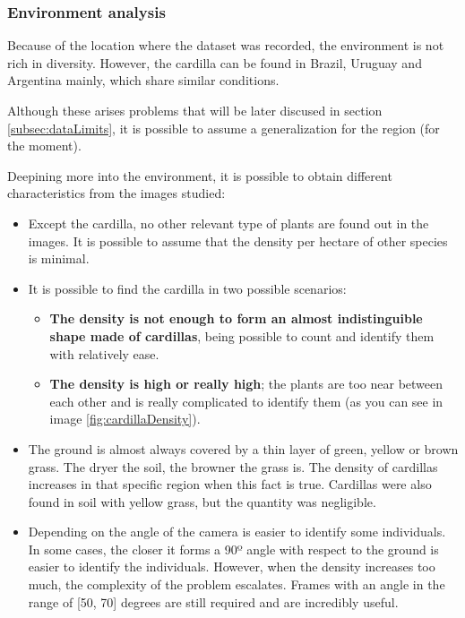\documentclass[12pt]{report} %
\begin{document}
\subsubsection{Environment analysis} Because of the location where the dataset was recorded, the environment is not rich in diversity. However, the cardilla can be found in Brazil, Uruguay and Argentina mainly, which share similar conditions. 

Although these arises problems that will be later discused in section \ref{subsec:dataLimits}, it is possible to assume a generalization for the region (for the moment).

Deepining more into the environment, it is possible to obtain different characteristics from the images studied:

\begin{itemize}
	\item Except the cardilla, no other relevant type of plants are found out in the images. It is possible to assume that the density per hectare of other species is minimal.
	\item It is possible to find the cardilla in two possible scenarios: 
	\begin{itemize}
		\item \textbf{The density is not enough to form an almost indistinguible shape made of cardillas}, being possible to count and identify them with relatively ease.
		\item \textbf{The density is high or really high}; the plants are too near between each other and is really complicated to identify them (as you can see in image \ref{fig:cardillaDensity}).
	\end{itemize}
	\item The ground is almost always covered by a thin layer of green, yellow or brown grass. The dryer the soil, the browner the grass is. The density of cardillas increases in that specific region when this fact is true. Cardillas were also found in soil with yellow grass, but the quantity was negligible.
	\item Depending on the angle of the camera is easier to identify some individuals. In some cases, the closer it forms a 90º angle with respect to the ground is easier to identify the individuals. However, when the density increases too much, the complexity of the problem escalates. Frames with an angle in the range of [50, 70] degrees are still required and are incredibly useful.
\end{itemize}
\end{document}
